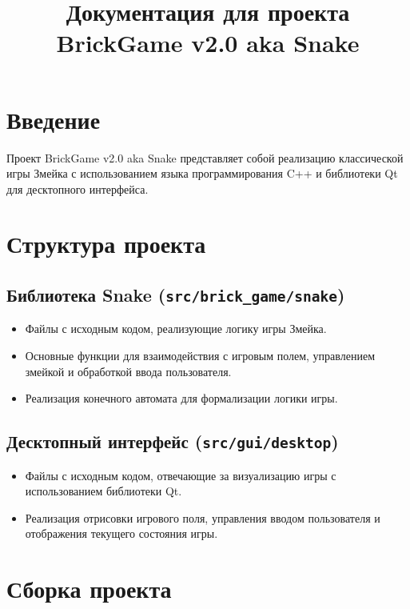 \documentclass{article}
\begin{document}
\title{Документация для проекта BrickGame v2.0 aka Snake}
\date{}
\maketitle

\section{Введение}

Проект BrickGame v2.0 aka Snake представляет собой реализацию классической игры Змейка с использованием языка программирования C++ и библиотеки Qt для десктопного интерфейса.

\section{Структура проекта}

\subsection{Библиотека Snake (\texttt{src/brick\_game/snake})}

\begin{itemize}[label=--]
    \item Файлы с исходным кодом, реализующие логику игры Змейка.
    \item Основные функции для взаимодействия с игровым полем, управлением змейкой и обработкой ввода пользователя.
    \item Реализация конечного автомата для формализации логики игры.
\end{itemize}

\subsection{Десктопный интерфейс (\texttt{src/gui/desktop})}

\begin{itemize}[label=--]
    \item Файлы с исходным кодом, отвечающие за визуализацию игры с использованием библиотеки Qt.
    \item Реализация отрисовки игрового поля, управления вводом пользователя и отображения текущего состояния игры.
\end{itemize}

\section{Сборка проекта}
\end{document}
